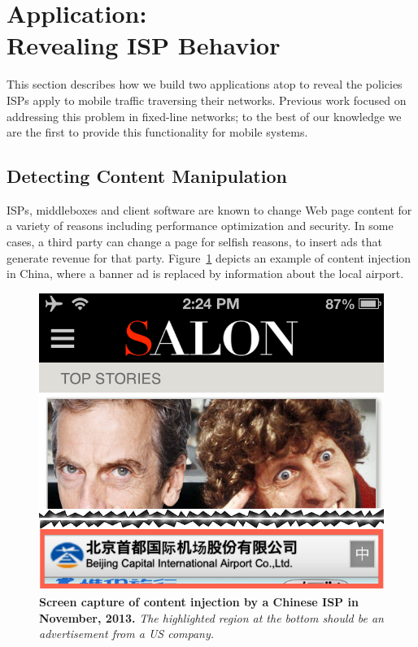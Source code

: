 \section{Application: \\
Revealing ISP Behavior}
\label{sec:isp-behavior}

This section describes how we build two applications atop \meddle to 
reveal the policies ISPs apply to mobile traffic traversing their networks. 
Previous work focused on addressing this problem in fixed-line networks; to 
the best of our knowledge we are the first to provide this functionality for 
mobile systems.

\subsection{Detecting Content Manipulation}

ISPs, middleboxes and client software are known to change Web page content for 
a variety of reasons including performance optimization and security. In some cases, 
a third party can change a page for selfish reasons, \eg to insert ads that generate revenue 
for that party. Figure~\ref{fig:tripnet-example} depicts an example of content injection in China, where 
a banner ad is replaced by information about the local airport.

\begin{figure}
\centering
\includegraphics[width=0.8\linewidth]{figures/injectioncrop.png}
\caption{\textbf{Screen capture of content injection by a Chinese ISP in November, 2013.} \emph{The 
highlighted region at the bottom should be an advertisement from a US company.} }
\vspace{\postfigspace}
\label{fig:tripnet-example}
\end{figure}


